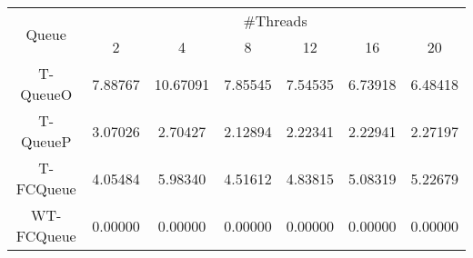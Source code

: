 \begin{tabular}{|c|c|c|c|c|c|c|}
\hline
\multirow{2}{*}{Queue} & \multicolumn{6}{c|}{\#Threads}\\\cline{2-7}& 2 & 4 & 8 & 12 & 16 & 20\\
\hline
\hline
T-QueueO & 7.88767 & 10.67091 & 7.85545 & 7.54535 & 6.73918 & 6.48418\\
T-QueueP & 3.07026 & 2.70427 & 2.12894 & 2.22341 & 2.22941 & 2.27197\\
T-FCQueue & 4.05484 & 5.98340 & 4.51612 & 4.83815 & 5.08319 & 5.22679\\
WT-FCQueue & 0.00000 & 0.00000 & 0.00000 & 0.00000 & 0.00000 & 0.00000\\
\hline\end{tabular}
